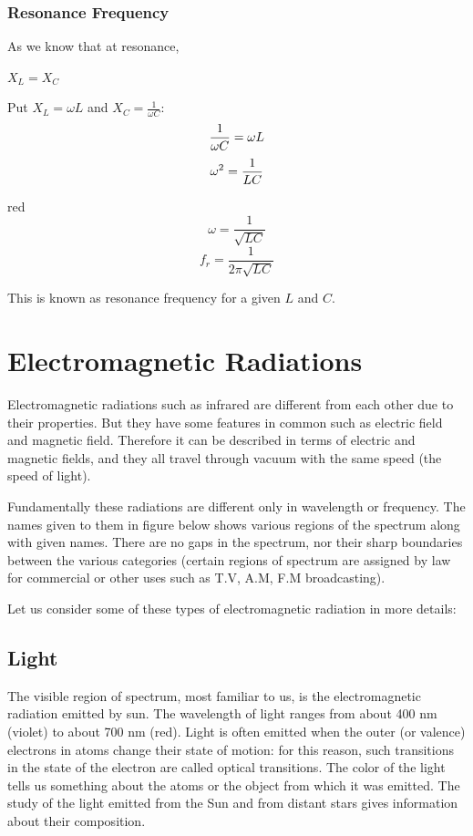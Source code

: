 \subsubsection{Resonance Frequency}
As we know that at resonance,
\begin{center}
    $X_{L}=X_{C}$
\end{center}
Put $X_{L}=\omega L$ and $X_{C} = \frac{1}{\omega C}$:
\begin{equation}\notag
    \frac{1}{\omega C} = \omega L
\end{equation}
\begin{equation}\notag
    \omega^{2} = \frac{1}{LC}
\end{equation}
\begin{mybox}{red}{}
\begin{equation}\label{eq:15.41}
    \omega = \frac{1}{\sqrt{LC}}
\end{equation}
\begin{equation}\label{eq:15.42}
    f_{r} = \frac{1}{2\pi\sqrt{LC}}
\end{equation}
\end{mybox}
\noindent This is known as resonance frequency for a given $L$ and $C$.
\section{Electromagnetic Radiations}
Electromagnetic radiations such as infrared are different from each other
due to their properties. But they have some features in common such as
electric field and magnetic field. Therefore it can be described in
terms of electric and magnetic fields, and they all travel through
vacuum with the same speed (the speed of light).

Fundamentally these radiations are different only in wavelength or
frequency. The names given to them in figure below shows various regions
of the spectrum along with given names. There are no gaps in the spectrum,
nor their sharp boundaries between the various categories (certain regions
of spectrum are assigned by law for commercial or other uses such as T.V,
A.M, F.M broadcasting).

Let us consider some of these types of electromagnetic radiation in more
details: 
\subsection{Light}
The visible region of spectrum, most familiar to us, is the
electromagnetic radiation emitted by sun. The wavelength of light
ranges from about 400 nm (violet) to about 700 nm (red). Light is
often emitted when the outer (or valence) electrons in atoms change
their state of motion: for this reason, such transitions in the state
of the electron are called optical transitions. The color of the light
tells us something about the atoms or the object from which it was emitted. The study of the light emitted from the Sun and from distant stars gives information about their composition.
